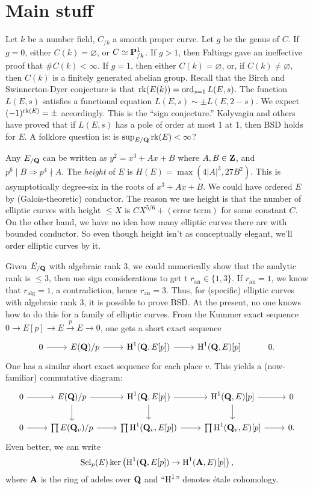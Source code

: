 




\section{Main stuff}

Let $k$ be a number field, $C_{/k}$ a smooth proper curve. Let $g$ be the 
genus of $C$. If $g=0$, either $C(k)=\varnothing$, or $C\simeq \mathbf{P}^1_{/k}$. 
If $g>1$, then Faltings gave an ineffective proof that $\# C(k)<\infty$. 
If $g=1$, then either $C(k)=\varnothing$, or, if $C(k)\ne\varnothing$, then 
$C(k)$ is a finitely generated abelian group. Recall that the Birch and 
Swinnerton-Dyer conjecture is that $\operatorname{rk}(E(k))=\operatorname{ord}_{s=1} L(E,s)$. The 
function $L(E,s)$ satisfies a functional equation $L(E,s) \sim \pm L(E,2-s)$. 
We expect $(-1)^{\operatorname{rk}(E)}=\pm$ accordingly. This is the ``sign conjecture.'' 
Kolyvagin and others have proved that if $L(E,s)$ has a pole of order at most 
$1$ at $1$, then BSD holds for $E$. A folklore question is: is 
$\sup_{E/\mathbf{Q}} \operatorname{rk}(E)<\infty$?

Any $E_{/\mathbf{Q}}$ can be written as $y^2=x^3+A x+B$ where $A,B\in \mathbf{Z}$, and 
$p^6\mid B\Rightarrow p^4\nmid A$. The \emph{height} of $E$ is 
$H(E)=\max(4|A|^3,27 B^2)$. This is asymptotically degree-six in the roots 
of $x^3+A x+B$. We could have ordered $E$ by (Galois-theoretic) conductor. The 
reason we use height is that the number of elliptic curves with height 
$\leqslant X$ is $C X^{5/6}+(\text{error term})$ for some constant $C$. On the 
other hand, we have no idea how many elliptic curves there are with bounded 
conductor. So even though height isn't as conceptually elegant, we'll order 
elliptic curves by it. 

Given $E_{/\mathbf{Q}}$ with algebraic rank $3$, we could numerically show that the 
analytic rank is $\leqslant 3$, then use sign considerations to get t
$r_\mathrm{an}\in \{1,3\}$. If $r_\mathrm{an}=1$, we know that 
$r_\mathrm{alg}=1$, a contradiction, hence $r_\mathrm{an}=3$. Thus, for 
(specific) elliptic curves with algebraic rank $3$, it is possible to prove 
BSD. At the present, no one knows how to do this for a family of elliptic 
curves. From the Kummer exact sequence $0\to E[p] \to E\xrightarrow p E \to 0$, 
one gets a short exact sequence
\[\begin{tikzcd}
  0 \ar[r] 
    & E(\dQ)/p \ar[r] 
    & \h^1(\dQ,E[p]) \ar[r] 
    & \h^1(\dQ,E)[p] 
    & 0 .
\end{tikzcd}\]
One has a similar short exact sequence for each place $v$. This yields a 
(now-familiar) commutative diagram:
\[\begin{tikzcd}
  0 \ar[r] 
    & E(\dQ)/p \ar[r] \ar[d] 
    & \h^1(\dQ,E[p]) \ar[r] \ar[d] 
    & \h^1(\dQ,E)[p] \ar[d] \ar[r] 
    & 0 \\
  0 \ar[r] 
    & \prod E(\dQ_v)/p \ar[r] 
    & \prod \h^1(\dQ_v,E[p]) \ar[r] 
    & \prod \h^1(\dQ_v,E)[p] \ar[r] 
    & 0.
\end{tikzcd}\]
Even better, we can write 
\[
  \operatorname{Sel}_p(E)  \ker\left(\operatorname{H}^1(\mathbf{Q},E[p])\to \operatorname{H}^1(\mathbf{A},E)[p]\right) ,
\]
where $\mathbf{A}$ is the ring of adeles over $\mathbf{Q}$ and ``$\operatorname{H}^1$'' denotes \'etale 
cohomology. 

